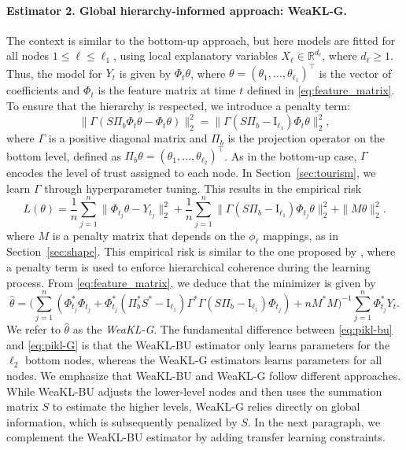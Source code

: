 \paragraph{Estimator 2. Global hierarchy-informed approach: WeaKL-G.} 
The context is similar to the bottom-up approach, but here models are fitted for all nodes $1 \leq \ell \leq \ell_1$, using local explanatory variables $X_\ell \in \mathbb{R}^{d_\ell}$, where $d_\ell \geq 1$. Thus, the model for $Y_{t}$ is given by $\mathbb \Phi_t \theta$, where $\theta = (\theta_1, \hdots, \theta_{\ell_1})^\top$ is the vector of coefficients and $\mathbb{\Phi}_t$ is the feature matrix at time $t$ defined in \eqref{eq:feature_matrix}.
To ensure that the hierarchy is respected, we introduce a penalty term:
\[
\|\Gamma(S\Pi_b\mathbb \Phi_t\theta-\mathbb \Phi_t\theta)\|_2^2  = \|\Gamma(S\Pi_b-\mathrm{I}_{\ell_1})\mathbb \Phi_t\theta\|_2^2,
\]
where $\Gamma$ is a positive diagonal matrix and $\Pi_b$ is the projection operator on the bottom level, defined as $\Pi_b \theta = (\theta_1, \hdots, \theta_{\ell_2})^\top$. As in the bottom-up case, $\Gamma$ encodes the level of trust assigned to each node. 
In Section~\ref{sec:tourism}, we learn $\Gamma$ through hyperparameter tuning. This results in the empirical risk
\[L(\theta) = \frac{1}{n}\sum_{j=1}^n\|\mathbb \Phi_{t_j} \theta - Y_{t_j}\|_2^2 + \frac{1}{n}\sum_{j=1}^n\|\Gamma(S\Pi_b-\mathrm{I}_{\ell_1})\mathbb \Phi_{t_j}\theta\|_2^2 + \|M\theta\|_2^2.\]
where $M$ is a penalty matrix that depends on the $\phi_\ell$ mappings, as in Section~\ref{sec:shape}.
This empirical risk is similar to the one proposed by \citet{Zheng2023coherent}, where a penalty term is used to enforce hierarchical coherence during the learning process.
From \eqref{eq:feature_matrix}, we deduce that the  minimizer is given by 
    \begin{equation}
    \label{eq:pikl-G}
        \hat \theta = \Big(\sum_{j=1}^n (\mathbb \Phi_{t_j}^\ast\mathbb \Phi_{t_j}+ \mathbb \Phi_{t_j}^\ast(\Pi_b^\ast S^\ast-\mathrm{I}_{\ell_1})\Gamma^\ast \Gamma(S\Pi_b-\mathrm{I}_{\ell_1})\mathbb \Phi_{t_j})+nM^\ast M\Big)^{-1} \sum_{j=1}^n \mathbb \Phi_{t_j}^\ast Y_t.
    \end{equation}
We refer to $\hat{\theta}$  as the {\it WeaKL-G}.
The fundamental difference between \eqref{eq:pikl-bu} and \eqref{eq:pikl-G} is that the WeaKL-BU estimator only learns parameters for the $\ell_2$ bottom nodes, whereas the WeaKL-G estimators learns parameters for all nodes. We emphasize that WeaKL-BU and WeaKL-G follow different approaches. While WeaKL-BU adjusts the lower-level nodes and then uses the summation matrix $S$ to estimate the higher levels, WeaKL-G relies directly on global information, which is subsequently penalized by $S$. In the next paragraph, we complement the WeaKL-BU estimator by adding transfer learning constraints.

